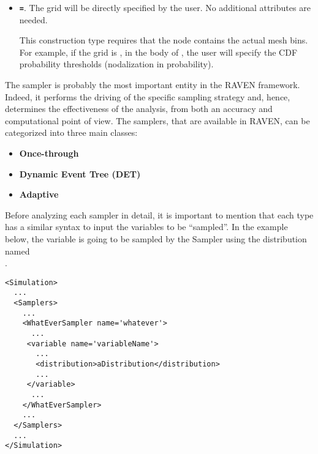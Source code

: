 {\begin{itemize}
      \begin{itemize}
      \item If the  is present, the grid lower bound
        will be at:\\
        $\xmlAttr{upperBound} - \xmlAttr{steps}*\xmlAttr{stepSize}$
      \item If the  is present, the grid upper bound
        will be at:\\
        $\xmlAttr{lowerBound} + \xmlAttr{steps}*\xmlAttr{stepSize}$
      \end{itemize}
      The lower and upper bounds are checked against the associated
       bounds.
      If one or both of them falls outside the distribution's bounds, the
      code will raise an error.
  \item {}\textbf{\texttt{=}}.
    The grid will be directly specified by the user.
    No additional attributes are needed.

    This construction type requires that the  node contains
    the actual mesh bins.
    For example, if the grid  is , in the body
    of , the user will specify the CDF probability thresholds
    (nodalization in probability).
\end{itemize}}

The sampler is probably the most important entity in the RAVEN framework.
%
Indeed, it performs the driving of the specific sampling strategy and, hence,
determines the effectiveness of the analysis, from both an accuracy and
computational point of view.
%
The samplers, that are available in RAVEN, can be categorized into three main
classes:
\begin{itemize}
\item \textbf{Once-through}
\item \textbf{Dynamic Event Tree (DET)}
\item \textbf{Adaptive}
\end{itemize}
Before analyzing each sampler in detail, it is important to mention that each
type has a similar syntax to input the variables to be ``sampled''.
%
In the example below, the variable  is going to be
sampled by the Sampler  using the distribution named\\
.
\begin{lstlisting}[style=XML]
<Simulation>
  ...
  <Samplers>
    ...
    <WhatEverSampler name='whatever'>
      ...
     <variable name='variableName'>
       ...
       <distribution>aDistribution</distribution>
       ...
     </variable>
      ...
    </WhatEverSampler>
    ...
  </Samplers>
  ...
</Simulation>
\end{lstlisting}

